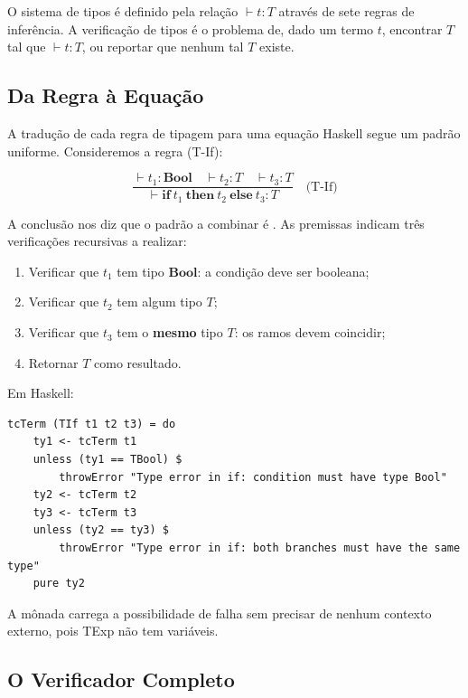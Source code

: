 O sistema de tipos é definido pela relação \(\vdash t : T\) através
de sete regras de inferência. A verificação de tipos é o problema de,
dado um termo \(t\), encontrar \(T\) tal que \(\vdash t : T\), ou
reportar que nenhum tal \(T\) existe.

\subsection{Da Regra à Equação}

A tradução de cada regra de tipagem para uma equação Haskell segue um
padrão uniforme. Consideremos a regra (T-If):

\[
  \frac{
    \vdash t_1 : \mathbf{Bool} \quad
    \vdash t_2 : T \quad
    \vdash t_3 : T
  }{
    \vdash \mathbf{if}\ t_1\ \mathbf{then}\ t_2\ \mathbf{else}\ t_3 : T
  } \quad\text{(T-If)}
\]

A conclusão nos diz que o padrão a combinar é
. As premissas indicam três
verificações recursivas a realizar:

\begin{enumerate}
  \item Verificar que \(t_1\) tem tipo \(\mathbf{Bool}\): a condição
    deve ser booleana;
  \item Verificar que \(t_2\) tem algum tipo \(T\);
  \item Verificar que \(t_3\) tem o \textbf{mesmo} tipo \(T\): os
    ramos devem coincidir;
  \item Retornar \(T\) como resultado.
\end{enumerate}

Em Haskell:

\begin{verbatim}
tcTerm (TIf t1 t2 t3) = do
    ty1 <- tcTerm t1
    unless (ty1 == TBool) $
        throwError "Type error in if: condition must have type Bool"
    ty2 <- tcTerm t2
    ty3 <- tcTerm t3
    unless (ty2 == ty3) $
        throwError "Type error in if: both branches must have the same type"
    pure ty2
\end{verbatim}

A mônada 
carrega a possibilidade de falha sem precisar de nenhum contexto
externo, pois TExp não tem variáveis.

\subsection{O Verificador Completo}

